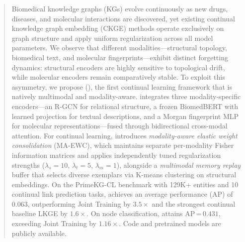 \begin{abstract}
Biomedical knowledge graphs (KGs) evolve continuously as new drugs, diseases, and molecular interactions are discovered, yet existing continual knowledge graph embedding (CKGE) methods operate exclusively on graph structure and apply uniform regularization across all model parameters.
We observe that different modalities---structural topology, biomedical text, and molecular fingerprints---exhibit distinct forgetting dynamics: structural encoders are highly sensitive to topological drift, while molecular encoders remain comparatively stable.
To exploit this asymmetry, we propose \fullname (\ours), the first continual learning framework that is natively multimodal and modality-aware.
\ours integrates three modality-specific encoders---an R-GCN for relational structure, a frozen BiomedBERT with learned projection for textual descriptions, and a Morgan fingerprint MLP for molecular representations---fused through bidirectional cross-modal attention.
For continual learning, \ours introduces \emph{modality-aware elastic weight consolidation} (MA-EWC), which maintains separate per-modality Fisher information matrices and applies independently tuned regularization strengths ($\lambda_s{=}10$, $\lambda_t{=}5$, $\lambda_m{=}1$), alongside a \emph{multimodal memory replay} buffer that selects diverse exemplars via K-means clustering on structural embeddings.
On the PrimeKG-CL benchmark with 129K+ entities and 10 continual link prediction tasks, \ours achieves an average performance (AP) of $0.063$, outperforming Joint Training by $3.5\times$ and the strongest continual baseline LKGE by $1.6\times$.
On node classification, \ours attains AP\,=\,$0.431$, exceeding Joint Training by $1.16\times$.
Code and pretrained models are publicly available.
\end{abstract}
